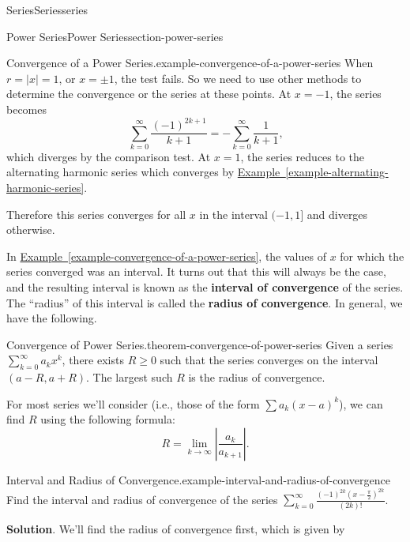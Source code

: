 \documentclass[oneside,10pt,]{book}
\newcommand{\terminology}[1]{\textbf{#1}}
\numberwithin{equation}{section}
\begin{document}
\begin{chapterptx}{Series}{}{Series}{}{}{series}
\begin{sectionptx}{Power Series}{}{Power Series}{}{}{section-power-series}
\begin{example}{Convergence of a Power Series.}{example-convergence-of-a-power-series}
\hypertarget{p-936}{}%
When \(r = |x| = 1\), or \(x = \pm1\), the test fails. So we need to use other methods to determine the convergence or the series at these points. At \(x = -1\), the series becomes%
\begin{equation*}
\sum_{k=0}^{\infty}\frac{(-1)^{2k+1}}{k+1} = - \sum_{k=0}^{\infty}\frac{1}{k+1}\text{,}
\end{equation*}
which diverges by the comparison test. At \(x = 1\), the series reduces to the alternating harmonic series which converges by \hyperref[example-alternating-harmonic-series]{Example~\ref{example-alternating-harmonic-series}}.%
\par
\hypertarget{p-937}{}%
Therefore this series converges for all \(x\) in the interval \((-1, 1]\) and diverges otherwise.%
\end{example}
\hypertarget{p-938}{}%
In \hyperref[example-convergence-of-a-power-series]{Example~\ref{example-convergence-of-a-power-series}}, the values of \(x\) for which the series converged was an interval. It turns out that this will always be the case, and the resulting interval is known as the \terminology{interval of convergence} of the series. The ``radius'' of this interval is called the \terminology{radius of convergence}. In general, we have the following.%
\begin{theorem}{Convergence of Power Series.}{}{theorem-convergence-of-power-series}%
\hypertarget{p-939}{}%
Given a series \(\sum_{k=0}^{\infty}a_{k}x^{k}\), there exists \(R \geq 0\) such that the series converges on the interval \((a - R, a + R)\). The largest such \(R\) is the radius of convergence.%
\end{theorem}
\hypertarget{p-940}{}%
For most series we'll consider (i.e., those of the form \(\sum a_{k}(x - a)^{k}\)), we can find \(R\) using the following formula:%
\begin{equation*}
R = \lim_{k\to\infty}\left|\frac{a_{k}}{a_{k+1}}\right|\text{.}
\end{equation*}
%
\begin{example}{Interval and Radius of Convergence.}{example-interval-and-radius-of-convergence}%
\hypertarget{p-941}{}%
Find the interval and radius of convergence of the series \(\sum_{k = 0}^{\infty}\frac{(-1)^{2k}(x - \frac{\pi}{2})^{2k}}{(2k)!}\).%
\par\smallskip%
\noindent\textbf{Solution}.\hypertarget{solution-191}{}\quad%
\hypertarget{p-942}{}%
We'll find the radius of convergence first, which is given by%
\begin{align*}

\end{align*}
\end{example}
\end{sectionptx}
\end{chapterptx}
\end{document}
